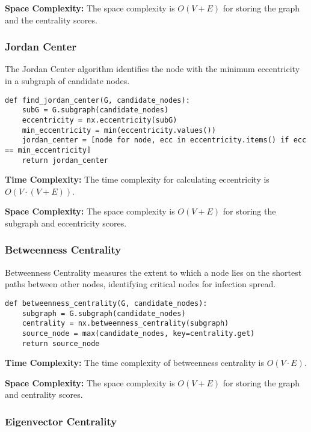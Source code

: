 \textbf{Space Complexity:} The space complexity is \(O(V + E)\) for storing the graph and the centrality scores.

\subsubsection{Jordan Center}

The Jordan Center algorithm identifies the node with the minimum eccentricity in a subgraph of candidate nodes.

\begin{lstlisting}[caption=Jordan Center Algorithm, label=lst:jordan-center]
def find_jordan_center(G, candidate_nodes):
    subG = G.subgraph(candidate_nodes)
    eccentricity = nx.eccentricity(subG)
    min_eccentricity = min(eccentricity.values())
    jordan_center = [node for node, ecc in eccentricity.items() if ecc == min_eccentricity]
    return jordan_center
\end{lstlisting}

\textbf{Time Complexity:} The time complexity for calculating eccentricity is \(O(V \cdot (V + E))\).

\textbf{Space Complexity:} The space complexity is \(O(V + E)\) for storing the subgraph and eccentricity scores.

\subsubsection{Betweenness Centrality}

Betweenness Centrality measures the extent to which a node lies on the shortest paths between other nodes, identifying critical nodes for infection spread.

\begin{lstlisting}[caption=Betweenness Centrality Algorithm, label=lst:betweenness-centrality]
def betweenness_centrality(G, candidate_nodes):
    subgraph = G.subgraph(candidate_nodes)
    centrality = nx.betweenness_centrality(subgraph)
    source_node = max(candidate_nodes, key=centrality.get)
    return source_node
\end{lstlisting}

\textbf{Time Complexity:} The time complexity of betweenness centrality is \(O(V \cdot E)\).

\textbf{Space Complexity:} The space complexity is \(O(V + E)\) for storing the graph and centrality scores.

\subsubsection{Eigenvector Centrality}

